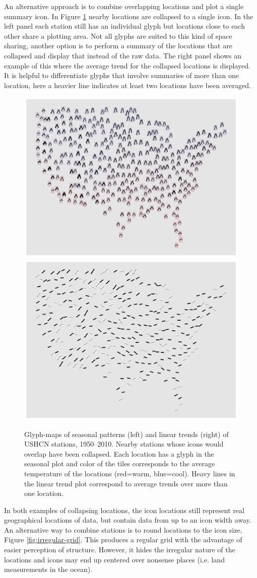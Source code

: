 \documentclass[oneside]{article}
\begin{document}
An alternative approach is to combine overlapping locations and plot a single summary icon.  In Figure \ref{fig:irregular-collapsed} nearby locations are collapsed to a single icon.  In the left panel each station still has an individual glyph but locations close to each other share a plotting area.  Not all glyphs are suited to this kind of space sharing, another option is to perform a summary of the locations that are collapsed and display that instead of the raw data.  The right panel shows an example of this where the average trend for the collapsed locations is displayed.  It is helpful to differentiate glyphs that involve summaries of more than one location, here a heavier line indicates at least two locations have been averaged.

\begin{figure}[htbp]
  \centering
  \includegraphics[width=0.5\linewidth]{usa-season-collapsed}%
  \includegraphics[width=0.5\linewidth]{usa-lin-collapse}%
  \caption{Glyph-maps of seasonal patterns (left) and linear trends (right) of USHCN stations, 1950--2010.  Nearby stations whose icons would overlap have been collapsed.  Each location has a glyph in the seasonal plot and color of the tiles corresponds to the average temperature of the locations (red=warm, blue=cool).  Heavy lines in the linear trend plot correspond to average trends over more than one location.}
  \label{fig:irregular-collapsed}
\end{figure}

In both examples of collapsing locations, the icon locations still represent real geographical locations of data, but contain data from up to an icon width away.  An alternative way to combine stations is to round locations to the icon size, Figure \ref{fig:irregular-grid}. This produces a regular grid with the advantage of easier perception of structure.  However, it hides the irregular nature of the locations and icons may end up centered over nonsense places (i.e. land measurements in the ocean).
\end{document}
